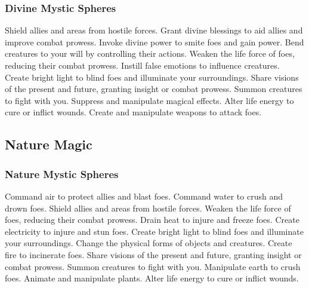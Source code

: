 \subsubsection{Divine Mystic Spheres}\label{Divine Mystic Spheres}
\begin{spelllist}
 Shield allies and areas from hostile forces.
 Grant divine blessings to aid allies and improve combat prowess.
 Invoke divine power to smite foes and gain power.
 Bend creatures to your will by controlling their actions.
 Weaken the life force of foes, reducing their combat prowess.
 Instill false emotions to influence creatures.
 Create bright light to blind foes and illuminate your surroundings.
 Share visions of the present and future, granting insight or combat prowess.
 Summon creatures to fight with you.
 Suppress and manipulate magical effects.
 Alter life energy to cure or inflict wounds.
 Create and manipulate weapons to attack foes.
\end{spelllist}



\small
\subsection{Nature Magic}\label{Nature Magic}
\subsubsection{Nature Mystic Spheres}\label{Nature Mystic Spheres}
\begin{spelllist}
 Command air to protect allies and blast foes.
 Command water to crush and drown foes.
 Shield allies and areas from hostile forces.
 Weaken the life force of foes, reducing their combat prowess.
 Drain heat to injure and freeze foes.
 Create electricity to injure and stun foes.
 Create bright light to blind foes and illuminate your surroundings.
 Change the physical forms of objects and creatures.
 Create fire to incinerate foes.
 Share visions of the present and future, granting insight or combat prowess.
 Summon creatures to fight with you.
 Manipulate earth to crush foes.
 Animate and manipulate plants.
 Alter life energy to cure or inflict wounds.
\end{spelllist}



